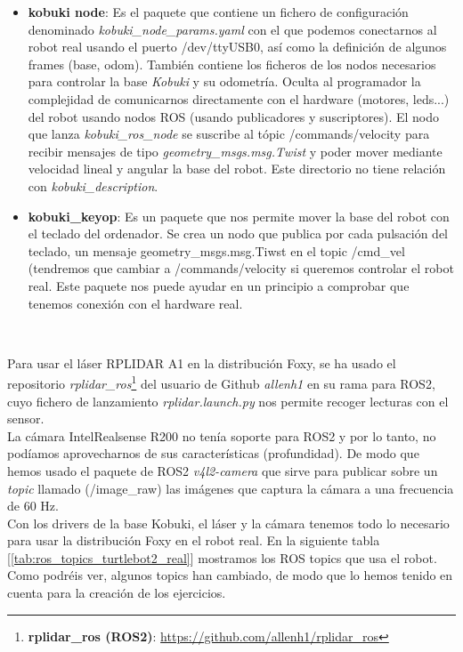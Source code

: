 \begin{itemize}
	\item \textbf{kobuki node}: Es el paquete que contiene un fichero de configuración denominado \textit{kobuki\_node\_params.yaml} con el que podemos conectarnos al robot real usando el puerto /dev/ttyUSB0, así como la definición de algunos frames (base, odom). También contiene los ficheros de los nodos necesarios para controlar la base \textit{Kobuki} y su odometría. Oculta al programador la complejidad de comunicarnos directamente con el hardware (motores, leds...) del robot usando nodos ROS (usando publicadores y suscriptores). El nodo que lanza \textit{kobuki\_ros\_node} se suscribe al tópic /commands/velocity para recibir mensajes de tipo \textit{geometry\_msgs.msg.Twist} y poder mover mediante velocidad lineal y angular la base del robot. Este directorio no tiene relación con \textit{kobuki\_description}.
	\item \textbf{kobuki\_keyop}: Es un paquete que nos permite mover la base del robot con el teclado del ordenador. Se crea un nodo que publica por cada pulsación del teclado, un mensaje geometry\_msgs.msg.Tiwst en el topic /cmd\_vel (tendremos que cambiar a /commands/velocity si queremos controlar el robot real. Este paquete nos puede ayudar en un principio a comprobar que tenemos conexión con el hardware real.
\end{itemize}\

Para usar el láser RPLIDAR A1 en la distribución Foxy, se ha usado el repositorio \textit{rplidar\_ros}\footnote{\textbf{rplidar\_ros (ROS2)}: \url{https://github.com/allenh1/rplidar_ros}} del usuario de Github \textit{allenh1} en su rama para ROS2, cuyo fichero de lanzamiento \textit{rplidar.launch.py} nos permite recoger lecturas con el sensor.\\

La cámara IntelRealsense R200 no tenía soporte para ROS2 y por lo tanto, no podíamos aprovecharnos de sus características (profundidad). De modo que hemos usado el paquete de ROS2 \textit{v4l2-camera} que sirve para publicar sobre un \textit{topic} llamado (/image\_raw) las imágenes que captura la cámara a una frecuencia de 60 Hz.\\

Con los drivers de la base Kobuki, el láser y la cámara tenemos todo lo necesario para usar la distribución Foxy en el robot real. En la siguiente tabla [\ref{tab:ros_topics_turtlebot2_real}] mostramos los ROS topics que usa el robot. Como podréis ver, algunos topics han cambiado, de modo que lo hemos tenido en cuenta para la creación de los ejercicios.\\

